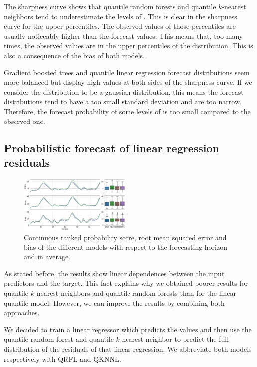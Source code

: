\documentclass[a4paper,twocolumn,5p]{elsarticle}
\begin{document}
The sharpness curve shows that quantile random forests 
and quantile $k$-nearest
neighbors tend to underestimate the levels of
\no. This is clear in the sharpness curve for the
upper percentiles. The observed values of those percentiles are
usually noticeably higher than the forecast values. This means that,
too many times, the observed values are in the upper percentiles of
the distribution. This is also a consequence of the bias of both
models.

Gradient boosted trees and quantile linear regression forecast
distributions seem more balanced but display high values at both sides
of the sharpness curve.  If we consider the distribution to be a
gaussian distribution, this means the forecast distributions tend to
have a too small standard deviation and are too narrow. Therefore, the
forecast probability of some levels of \no is too
small compared to the observed one.

\subsection{Probabilistic forecast of linear regression residuals}

\begin{figure}[tbp]
  \centering
  \includegraphics[width=0.48\textwidth]{errorGraph_rfl_knnl}
  \caption{Continuous ranked probability score, root mean squared
    error and bias of the different models with respect to the
    forecasting horizon and in average.}
  \label{figure:errorGraph_rfl}
\end{figure}

As stated before, the results show linear dependences between the
input predictors and the target. This fact explains why we obtained
poorer results for quantile $k$-nearest neighbors and quantile random
forests than for the linear quantile model. However, we can improve
the results by combining both approaches.

We decided to train a linear regressor which predicts the
\no values and then use the quantile random forest and quantile
$k$-nearest neighbor to predict the full distribution of the residuals
of that linear regression. We abbreviate both models respectively with
QRFL and QKNNL.
\end{document}
